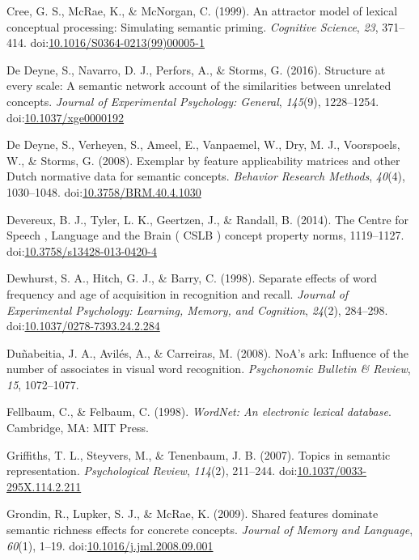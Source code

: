 \documentclass[english,,man]{apa6}
\theoremstyle{definition}
\theoremstyle{definition}
\theoremstyle{definition}
\theoremstyle{remark}
\begin{document}
\hypertarget{ref-Cree1999}{}
Cree, G. S., McRae, K., \& McNorgan, C. (1999). An attractor model of
lexical conceptual processing: Simulating semantic priming.
\emph{Cognitive Science}, \emph{23}, 371--414.
doi:\href{https://doi.org/10.1016/S0364-0213(99)00005-1}{10.1016/S0364-0213(99)00005-1}

\hypertarget{ref-DeDeyne2016}{}
De Deyne, S., Navarro, D. J., Perfors, A., \& Storms, G. (2016).
Structure at every scale: A semantic network account of the similarities
between unrelated concepts. \emph{Journal of Experimental Psychology:
General}, \emph{145}(9), 1228--1254.
doi:\href{https://doi.org/10.1037/xge0000192}{10.1037/xge0000192}

\hypertarget{ref-DeDeyne2008}{}
De Deyne, S., Verheyen, S., Ameel, E., Vanpaemel, W., Dry, M. J.,
Voorspoels, W., \& Storms, G. (2008). Exemplar by feature applicability
matrices and other Dutch normative data for semantic concepts.
\emph{Behavior Research Methods}, \emph{40}(4), 1030--1048.
doi:\href{https://doi.org/10.3758/BRM.40.4.1030}{10.3758/BRM.40.4.1030}

\hypertarget{ref-Devereux2014}{}
Devereux, B. J., Tyler, L. K., Geertzen, J., \& Randall, B. (2014). The
Centre for Speech , Language and the Brain ( CSLB ) concept property
norms, 1119--1127.
doi:\href{https://doi.org/10.3758/s13428-013-0420-4}{10.3758/s13428-013-0420-4}

\hypertarget{ref-Dewhurst1998}{}
Dewhurst, S. A., Hitch, G. J., \& Barry, C. (1998). Separate effects of
word frequency and age of acquisition in recognition and recall.
\emph{Journal of Experimental Psychology: Learning, Memory, and
Cognition}, \emph{24}(2), 284--298.
doi:\href{https://doi.org/10.1037/0278-7393.24.2.284}{10.1037/0278-7393.24.2.284}

\hypertarget{ref-Dunabeitia2008}{}
Duñabeitia, J. A., Avilés, A., \& Carreiras, M. (2008). NoA's ark:
Influence of the number of associates in visual word recognition.
\emph{Psychonomic Bulletin \& Review}, \emph{15}, 1072--1077.

\hypertarget{ref-Felbaum1998}{}
Fellbaum, C., \& Felbaum, C. (1998). \emph{WordNet: An electronic
lexical database}. Cambridge, MA: MIT Press.

\hypertarget{ref-Griffiths2007}{}
Griffiths, T. L., Steyvers, M., \& Tenenbaum, J. B. (2007). Topics in
semantic representation. \emph{Psychological Review}, \emph{114}(2),
211--244.
doi:\href{https://doi.org/10.1037/0033-295X.114.2.211}{10.1037/0033-295X.114.2.211}

\hypertarget{ref-Grondin2009}{}
Grondin, R., Lupker, S. J., \& McRae, K. (2009). Shared features
dominate semantic richness effects for concrete concepts. \emph{Journal
of Memory and Language}, \emph{60}(1), 1--19.
doi:\href{https://doi.org/10.1016/j.jml.2008.09.001}{10.1016/j.jml.2008.09.001}
\end{document}
